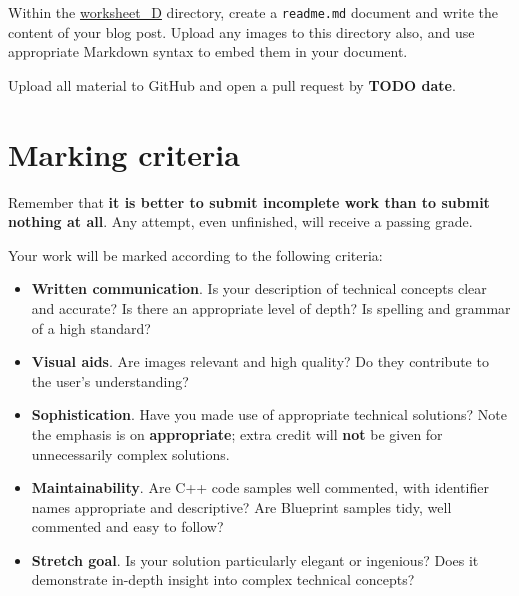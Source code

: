 \documentclass{../../fal_assignment}
\begin{document}
Within the \url{worksheet_D} directory, create a \texttt{readme.md} document
and write the content of your blog post.
Upload any images to this directory also, and use appropriate Markdown syntax to embed them in your document.

Upload all material to GitHub and open a pull request
by \textbf{TODO date}.

\section*{Marking criteria}

Remember that \textbf{it is better to submit incomplete work than to submit nothing at all}.
Any attempt, even unfinished, will receive a passing grade.

Your work will be marked according to the following criteria:
\begin{itemize}
	\item \textbf{Written communication}. Is your description of technical concepts clear and accurate?
		Is there an appropriate level of depth?
		Is spelling and grammar of a high standard?
	\item \textbf{Visual aids}. Are images relevant and high quality?
		Do they contribute to the user's understanding?
	\item \textbf{Sophistication}. Have you made use of appropriate technical solutions?
		Note the emphasis is on \textbf{appropriate}; extra credit will \textbf{not} be given for unnecessarily complex solutions.
	\item \textbf{Maintainability}. Are C++ code samples well commented, with identifier names appropriate and descriptive?
		Are Blueprint samples tidy, well commented and easy to follow?
	\item \textbf{Stretch goal}. Is your solution particularly elegant or ingenious?
		Does it demonstrate in-depth insight into complex technical concepts?
\end{itemize}
\end{document}
